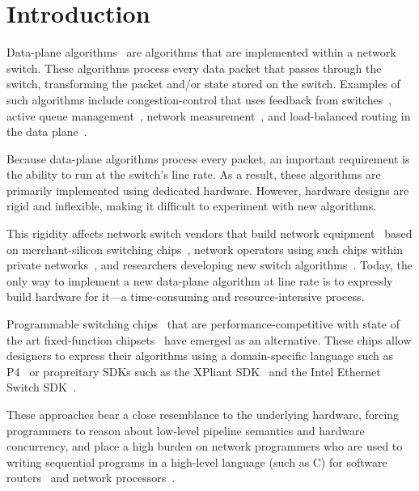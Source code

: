 \section{Introduction}
\label{s:intro}

Data-plane algorithms~\cite{cestan} are algorithms that are implemented within
a network switch. These algorithms process every data packet that passes
through the switch, transforming the packet and/or state stored on the switch.
Examples of such algorithms include congestion-control that uses feedback from
switches~\cite{xcp, rcp, pdq, dctcp}, active queue management~\cite{codel},
network measurement~\cite{opensketch, bitmap_george, elephant_george}, and
load-balanced routing in the data plane~\cite{conga}.

Because data-plane algorithms process every packet, an important requirement is
the ability to run at the switch's line rate.  As a result, these algorithms
are primarily implemented using dedicated hardware. However, hardware designs
are rigid and inflexible, making it difficult to experiment with new
algorithms.

This rigidity affects network switch vendors that build network
equipment~\cite{cisco_nexus, dell_force10, arista_7050} based on
merchant-silicon switching chips~\cite{trident, tomahawk, mellanox},  network
operators using such chips within private networks~\cite{jupiter,amazon,isp},
and researchers developing new switch algorithms~\cite{xcp, codel, d3, detail,
pdq}. Today, the only way to implement a new data-plane algorithm at line rate
is to expressly build hardware for it---a time-consuming and resource-intensive
process.

Programmable switching chips~\cite{flexpipe, xpliant, rmt} that are
performance-competitive with state of the art fixed-function
chipsets~\cite{trident, tomahawk, mellanox} have emerged as an alternative.
These chips allow designers to express their algorithms using a domain-specific
language such as P4~\cite{p4} or propreitary SDKs such as the XPliant
SDK~\cite{xpliant_sdk, xpliant_sdk2} and the Intel Ethernet Switch
SDK~\cite{intel_sdk}.

These approaches bear a close resemblance to the underlying hardware, forcing
programmers to reason about low-level pipeline semantics and hardware
concurrency, and place a high burden on network programmers who are used to
writing sequential programs in a high-level language (such as C) for software
routers~\cite{click} and network processors~\cite{ixp4xx, ixp2800}.

